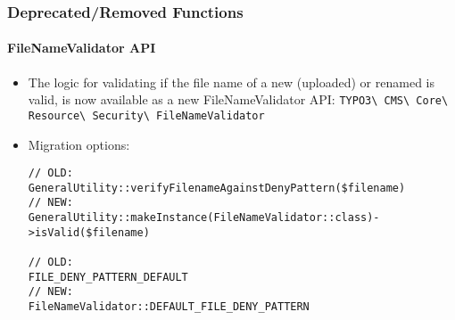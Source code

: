 
\begin{frame}[fragile]
	\frametitle{Deprecated/Removed Functions}
	\framesubtitle{FileNameValidator API}

	\lstset{basicstyle=\tiny\ttfamily}

	\begin{itemize}
		\item The logic for validating if the file name of a new (uploaded) or
			renamed is valid, is now available as a new FileNameValidator API:\newline
			\small
				\texttt{TYPO3\textbackslash
					CMS\textbackslash
					Core\textbackslash
					Resource\textbackslash
					Security\textbackslash
					FileNameValidator}
			\normalsize

		\item Migration options:

\begin{lstlisting}
// OLD:
GeneralUtility::verifyFilenameAgainstDenyPattern($filename)
// NEW:
GeneralUtility::makeInstance(FileNameValidator::class)->isValid($filename)

// OLD:
FILE_DENY_PATTERN_DEFAULT
// NEW:
FileNameValidator::DEFAULT_FILE_DENY_PATTERN
\end{lstlisting}

	\end{itemize}

\end{frame}


